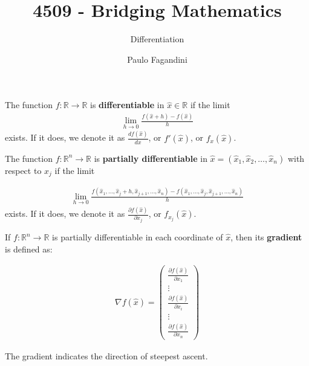 \documentclass[aspectratio=169]{beamer}
\title[]{4509 - Bridging Mathematics}
\subtitle{Differentiation}
\author[P. Fagandini]{Paulo Fagandini}
\institute{}
\date{}
\begin{document}
\begin{frame}
   \begin{definition}
        The function $f:\mathds{R}\rightarrow\mathds{R}$ is \textbf{differentiable} in $\hat{x}\in\mathds{R}$ if the limit
        \begin{align*}
            \lim_{h\rightarrow 0}\frac{f(\hat{x}+h)-f(\hat{x})}{h}
        \end{align*}
        exists. If it does, we denote it as $\frac{df(\hat{x})}{dx} $, or $f'(\hat{x})$, or $f_x(\hat{x})$.
   \end{definition}
\end{frame}

\begin{frame}
    \begin{definition}
        The function $f:\mathds{R}^n\rightarrow \mathds{R}$ is \textbf{partially differentiable} in $\hat{x}=(\hat{x}_1,\hat{x}_2,\ldots,\hat{x}_n)$ with respect to $x_j$ if the limit
        
        \begin{align*}
            \lim_{h\rightarrow 0}\frac{f(\hat{x}_1,\ldots,\hat{x}_j+h,\hat{x}_{j+1},\ldots,\hat{x}_n)-f(\hat{x}_1,\ldots,\hat{x}_{j},\hat{x}_{j+1},\ldots,\hat{x}_n)}{h}
        \end{align*}
        exists. If it does, we denote it as $\frac{\partial f(\hat{x})}{\partial x_j} $, or $f_{x_j}(\hat{x})$.
    \end{definition}
\end{frame}

\begin{frame}
\begin{definition}
    If $f:\mathds{R}^n\rightarrow\mathds{R}$ is partially differentiable in each coordinate of $\hat{x}$, then its \textbf{gradient} is defined as:
    
    \begin{align*}
        \nabla f(\hat{x}) = \left(\begin{array}{c}\frac{\partial f(\hat{x})}{\partial x_1}\\ \vdots \\ \frac{\partial f(\hat{x})}{\partial x_i} \\ \vdots \\ \frac{\partial f(\hat{x})}{\partial x_n}\end{array}\right)
    \end{align*}
\end{definition}

The gradient indicates the direction of steepest ascent.

\end{frame}
\end{document}
